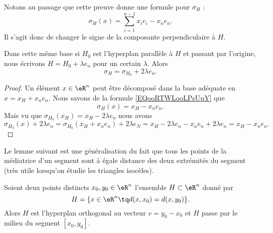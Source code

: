 Notons au passage que cette preuve donne une formule pour \( \sigma_H\) :
\begin{equation}        \label{EQooRTWLooLPsUpY}
    \sigma_H(x)=\sum_{i=1}^{n-1}x_ie_i-x_ne_n.
\end{equation}
Il s'agit donc de changer le signe de la composante perpendiculaire à \( H\).

\begin{lemma}       \label{LEMooWYVRooQmWqvM}
    Dans cette même base si \( H_0\) est l'hyperplan parallèle à \( H\) et passant par l'origine, nous écrivons \( H=H_0+\lambda e_n\) pour un certain \( \lambda\). Alors
    \begin{equation}
        \sigma_H=\sigma_{H_0}+2\lambda e_n.
    \end{equation}
\end{lemma}

\begin{proof}
    Un élément \( x\in \eR^n\) peut être décomposé dans la base adéquate en \( x=x_H+x_ne_n\). Nous savons de la formule \eqref{EQooRTWLooLPsUpY} que 
    \begin{equation}
        \sigma_H(x)=x_H-x_ne_n.
    \end{equation}
    Mais vu que \( \sigma_{H_0}(x_H)=x_H-2\lambda e_n\) nous avons
    \begin{equation}
            \sigma_{H_0}(x)+2\lambda e_n=\sigma_{H_0}(x_H+x_ne_n)+2\lambda e_N=x_H-2\lambda e_n-x_ne_n+2\lambda e_n=x_H-x_ne_n.
    \end{equation}
\end{proof}

Le lemme suivant est une généralisation du fait que tous les points de la médiatrice d'un segment sont à égale distance des deux extrémités du segment (très utile lorsqu'on étudie les triangles isocèles).
\begin{lemma}        \label{LEMooDPLYooJKZxiM}
    Soient deux points distincts \( x_0,y_0\in \eR^n\) l'ensemble \( H\subset \eR^n\) donné par
    \begin{equation}
        H=\{ x\in \eR^n\tq d(x,x_0)=d(x,y_0) \}.
    \end{equation}
    Alors \( H\) est l'hyperplan orthogonal au vecteur \( v=y_0-x_0\) et \( H\) passe par le milieu du segment \( [x_0,y_0] \).
\end{lemma}

